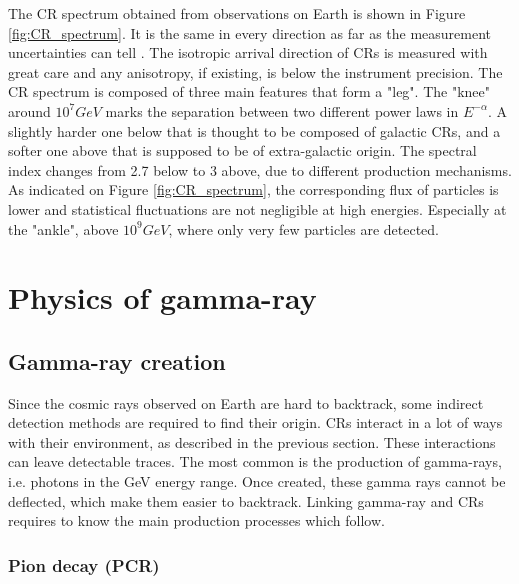 The CR spectrum obtained from observations on Earth is shown in Figure \ref{fig:CR_spectrum}. It is the same in every direction as far as the measurement uncertainties can tell \cite{Hillas1984}. The isotropic arrival direction of CRs is measured with great care and any anisotropy, if existing, is below the instrument precision.
The CR spectrum is composed of three main features that form a "leg". The "knee" around $10^{7} GeV$ marks the separation between two different power laws in $E^{-\alpha}$. A slightly harder one below that is thought to be composed of galactic CRs, and a softer one above that is supposed to be of extra-galactic origin. The spectral index changes from 2.7 below to 3 above, due to different production mechanisms. \cite{Biermann1995}
As indicated on Figure \ref{fig:CR_spectrum}, the corresponding flux of particles is lower and statistical fluctuations are not negligible at high energies. Especially at the "ankle", above $10^9 GeV$, where only very few particles are detected.


\section{Physics of gamma-ray}

\subsection{Gamma-ray creation}

Since the cosmic rays observed on Earth are hard to backtrack, some indirect detection methods are required to find their origin. CRs interact in a lot of ways with their environment, as described in the previous section. These interactions can leave detectable traces. The most common is the production of gamma-rays, i.e. photons in the GeV energy range. Once created, these gamma rays cannot be deflected, which make them easier to backtrack. Linking gamma-ray and CRs requires to know the main production processes which follow.

\subsubsection{Pion decay (PCR)}


